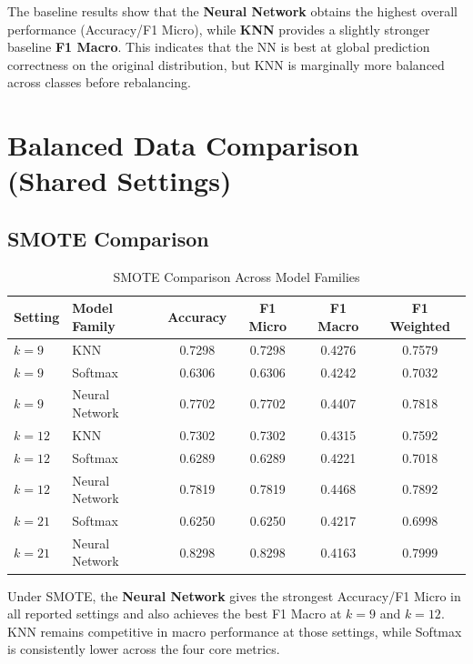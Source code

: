 \documentclass[12pt,a4paper]{report}
\begin{document}
The baseline results show that the \textbf{Neural Network} obtains the highest overall performance (Accuracy/F1 Micro), while \textbf{KNN} provides a slightly stronger baseline \textbf{F1 Macro}. This indicates that the NN is best at global prediction correctness on the original distribution, but KNN is marginally more balanced across classes before rebalancing.

\section{Balanced Data Comparison (Shared Settings)}
\subsection{SMOTE Comparison}
\begin{table}[H]
    \centering
    \caption{SMOTE Comparison Across Model Families}
    \label{tab:smote-comparison-all-models}
    \begin{tabular}{llcccc}
        \toprule
        \textbf{Setting} & \textbf{Model Family} & \textbf{Accuracy} & \textbf{F1 Micro} & \textbf{F1 Macro} & \textbf{F1 Weighted} \\
        \midrule
        $k=9$ & KNN & 0.7298 & 0.7298 & 0.4276 & 0.7579 \\
        $k=9$ & Softmax & 0.6306 & 0.6306 & 0.4242 & 0.7032 \\
        $k=9$ & Neural Network & 0.7702 & 0.7702 & 0.4407 & 0.7818 \\
        \midrule
        $k=12$ & KNN & 0.7302 & 0.7302 & 0.4315 & 0.7592 \\
        $k=12$ & Softmax & 0.6289 & 0.6289 & 0.4221 & 0.7018 \\
        $k=12$ & Neural Network & 0.7819 & 0.7819 & 0.4468 & 0.7892 \\
        \midrule
        $k=21$ & Softmax & 0.6250 & 0.6250 & 0.4217 & 0.6998 \\
        $k=21$ & Neural Network & 0.8298 & 0.8298 & 0.4163 & 0.7999 \\
        \bottomrule
    \end{tabular}
\end{table}

Under SMOTE, the \textbf{Neural Network} gives the strongest Accuracy/F1 Micro in all reported settings and also achieves the best F1 Macro at $k=9$ and $k=12$. KNN remains competitive in macro performance at those settings, while Softmax is consistently lower across the four core metrics.
\end{document}
